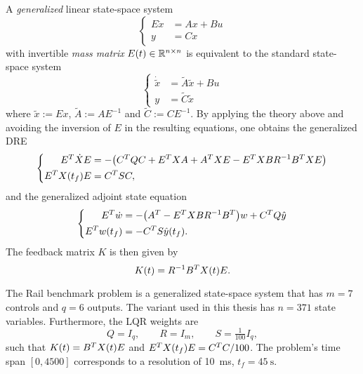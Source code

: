 \begin{remark}
  A \emph{generalized} linear state-space system
  \begin{equation}
  \label{eq:basics:system:generalized}
  \left\{
  \begin{aligned}
    E \dot x &= Ax + Bu \\
    y &= Cx
  \end{aligned}
  \right.
  \end{equation}
  with invertible \emph{mass matrix} $E(t)\in\mathbb{R}^{n\times n}$ is equivalent to the
  standard state-space system
  \begin{equation}
  \left\{
  \begin{aligned}
    \dot{\tilde x} &= \tilde A \tilde x + Bu \\
    y &= \tilde C \tilde x
  \end{aligned}
  \right.
  \end{equation}
  where $\tilde x := E x$, $\tilde A := A E^{-1}$ and $\tilde C := C E^{-1}$.
  By applying the theory above
  and avoiding the inversion of $E$ in the resulting equations,
  one obtains the generalized \ac{DRE}
  \begin{equation}
  \left\{
  \begin{aligned}
    E^T \dot X E &= -\big( C^T Q C + E^T X A + A^T X E - E^T X B R^{-1} B^T X E \big) \\
    E^T X(t_f) E &= C^T S C
    ,
  \end{aligned}
  \right.
  \end{equation}
  and the generalized adjoint state equation
  \begin{equation}
  \left\{
  \begin{aligned}
    E^T \dot w &= - \big( A^T - E^T X B R^{-1} B^T \big) w + C^T Q \hat y \\
    E^T w(t_f) &= - C^T S \hat y(t_f)
    .
  \end{aligned}
  \right.
  \end{equation}
  The feedback matrix $K$ is then given by
  \begin{equation}
    K(t) = R^{-1} B^T X(t) E
    .
  \end{equation}
\end{remark}

\begin{example}
\label{thm:rail:parameters}
  The Rail benchmark problem \cite{morwiki_steel}
  is a generalized state-space system that has $m=7$ controls and $q=6$ outputs.
  The variant used in this thesis has $n=371$ state variables.
  Furthermore, the \ac{LQR} weights are
  \begin{equation*}
    Q = I_q,
    \qquad
    R = I_m,
    \qquad
    S = \tfrac{1}{100} I_q,
  \end{equation*}
  such that $K(t) = B^T X(t) E$
  and $E^T X(t_f) E = C^T C /100$.
  The problem's time span $[0,4500]$ corresponds to a resolution of \SI{10}{\milli\second},
  \ie $t_f = \SI{45}{\second}$.
\end{example}


